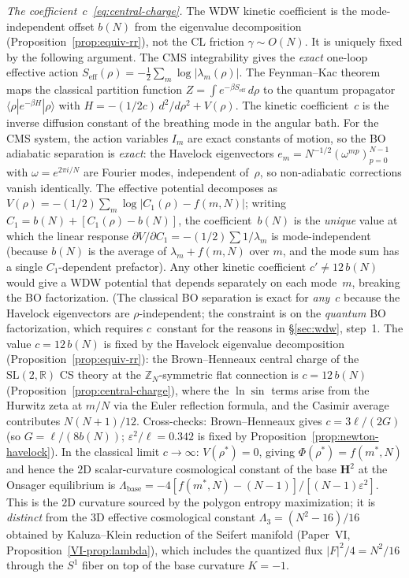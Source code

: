 \begin{proposition}
\emph{The coefficient~$c$~\eqref{eq:central-charge}.}
The WDW kinetic coefficient is the mode-independent offset
$b(N)$ from the eigenvalue decomposition
(Proposition~\ref{prop:equiv-rr}), not the CL friction
$\gamma \sim O(N)$.
It is uniquely fixed by the following argument.
The CMS integrability gives the \emph{exact} one-loop
effective action
$S_{\mathrm{eff}}(\rho) = -\tfrac{1}{2}\sum_m\log|\lambda_m(\rho)|$.
The Feynman--Kac theorem maps the classical partition
function $Z = \int e^{-\beta S_{\mathrm{eff}}}\,d\rho$ to
the quantum propagator $\langle\rho|e^{-\beta H}|\rho\rangle$
with $H = -(1/2c)\,d^2/d\rho^2 + V(\rho)$.
The kinetic coefficient~$c$ is the inverse diffusion constant
of the breathing mode in the angular bath.
For the CMS system, the action variables $I_m$ are exact
constants of motion, so the BO adiabatic separation is
\emph{exact}: the Havelock eigenvectors $e_m = N^{-1/2}
(\omega^{mp})_{p=0}^{N-1}$ with $\omega = e^{2\pi i/N}$
are Fourier modes, independent of~$\rho$, so
non-adiabatic corrections vanish identically.
The effective potential decomposes as
$V(\rho) = -(1/2)\sum_m\log|C_1(\rho) - f(m,N)|$;
writing $C_1 = b(N) + [C_1(\rho) - b(N)]$, the
coefficient~$b(N)$ is the \emph{unique} value at which
the linear response $\partial V/\partial C_1 = -(1/2)\sum 1/\lambda_m$
is mode-independent (because $b(N)$ is the average of
$\lambda_m + f(m,N)$ over $m$, and the mode sum has
a single $C_1$-dependent prefactor).
Any other kinetic coefficient $c' \ne 12\,b(N)$ would
give a WDW potential that depends separately on each
mode~$m$, breaking the BO factorization.
(The classical BO separation is exact for \emph{any}~$c$
because the Havelock eigenvectors are $\rho$-independent;
the constraint is on the \emph{quantum} BO factorization,
which requires $c$~constant for the reasons in
\S\ref{sec:wdw}, step~1.
The value $c = 12\,b(N)$ is fixed by the Havelock eigenvalue
decomposition (Proposition~\ref{prop:equiv-rr}):
the Brown--Henneaux central charge of the
$\mathrm{SL}(2,\mathbb{R})$ CS theory at the
$\mathbb{Z}_N$-symmetric flat connection is $c = 12\,b(N)$
(Proposition~\ref{prop:central-charge}), where the
$\ln\sin$ terms arise from the Hurwitz zeta at $m/N$
via the Euler reflection formula, and the Casimir average
contributes $N(N{+}1)/12$.
Cross-checks: Brown--Henneaux gives $c = 3\ell/(2G)$
(so $G = \ell/(8 b(N))$;
$\varepsilon^2/\ell = 0.342$ is fixed by
Proposition~\ref{prop:newton-havelock}).
In the classical limit $c \to \infty$:
$V(\rho^*) = 0$, giving $\Phi(\rho^*) = f(m^*,N)$ and hence
the $2$D scalar-curvature cosmological constant of the base
$\mathbf{H}^2$ at the Onsager equilibrium is
$\Lambda_{\mathrm{base}}
= -4[f(m^*,N) - (N{-}1)]/[(N{-}1)\varepsilon^2]$.
This is the $2$D curvature sourced by the polygon entropy
maximization; it is \emph{distinct} from the $3$D effective
cosmological constant $\Lambda_3 = (N^2{-}16)/16$ obtained by
Kaluza--Klein reduction of the Seifert manifold
(Paper~VI, Proposition~\ref*{VI-prop:lambda}),
which includes the quantized flux $|F|^2/4 = N^2/16$ through
the $S^1$ fiber on top of the base curvature $K = -1$.
\end{proposition}

